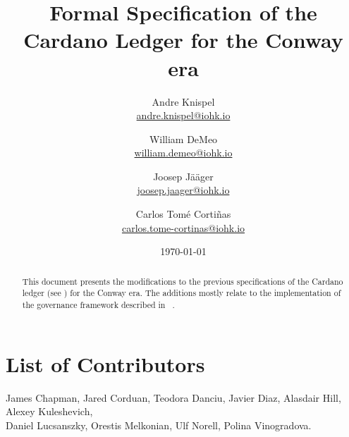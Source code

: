 \documentclass[11pt,a4paper,dvipsnames]{article}
\begin{document}
\title{Formal Specification of the Cardano Ledger for the Conway era}

\author{%
  Andre Knispel \\ {\small \href{mailto:andre.knispel@iohk.io}{andre.knispel@iohk.io}}
  \and
  William DeMeo \\ {\small \href{mailto:william.demeo@iohk.io}{william.demeo@iohk.io}}
  \and
  Joosep Jääger \\ {\small \href{mailto:joosep.jaager@iohk.io}{joosep.jaager@iohk.io}}
  \and
  Carlos Tom\'{e} Corti\~{n}as \\ {\small \href{mailto:carlos.tome-cortinas@iohk.io}{carlos.tome-cortinas@iohk.io}}
}

\date{\today}

\maketitle

\section*{List of Contributors}
\label{acknowledgements}
James Chapman, Jared Corduan, Teodora Danciu, Javier Diaz, Alasdair Hill, Alexey Kuleshevich,\\
Daniel Lucsanszky, Orestis Melkonian, Ulf Norell, Polina Vinogradova.

\begin{abstract}
  This document presents the modifications to the previous
  specifications of the Cardano ledger (see
  \cite{shelley-ledger-spec,shelley-ma-ledger-spec,alonzo-ledger-spec,babbage-ledger-spec})
  for the Conway era.  The additions mostly relate to the implementation of the governance
  framework described in ~\parencite{cip1694}.
\end{abstract}

\tableofcontents

\clearpage

















\clearpage

\printbibliography

\clearpage

\appendix




\end{document}
